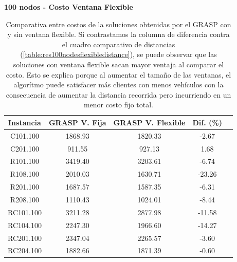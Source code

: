 \documentclass{article}
\begin{document}
  \begin{table}[h!]
    \centering
    \caption*{{\bf 100 nodos - Costo Ventana Flexible}}
    \begin{tabular}{ccccc}
      \toprule
      Instancia & GRASP V. Fija & GRASP V. Flexible & Dif. (\%) \\
      \midrule
      C101.100  & 1868.93 & 1820.33 &  -2.67 \\
      C201.100  &  911.55 &  927.13 &   1.68 \\
      R101.100  & 3419.40 & 3203.61 &  -6.74 \\
      R108.100  & 2010.03 & 1630.71 & -23.26 \\
      R201.100  & 1687.57 & 1587.35 &  -6.31 \\
      R208.100  & 1110.43 & 1024.01 &  -8.44 \\ 
      RC101.100 & 3211.28 & 2877.98 & -11.58 \\
      RC104.100 & 2247.30 & 1966.60 & -14.27 \\
      RC201.100 & 2347.04 & 2265.57 &  -3.60 \\
      RC204.100 & 1882.66 & 1871.39 &  -0.60 \\
      \bottomrule
    \end{tabular}
    \caption{Comparativa entre costos de la soluciones obtenidas por el GRASP con y sin ventana flexible. Si contrastamos la columna de diferencia contra el cuadro comparativo de distancias (\ref{table:res100nodesflexibledistance}), se puede observar que las soluciones con ventana flexible sacan mayor ventaja al comparar el costo. Esto se explica porque al aumentar el tamaño de las ventanas, el algorítmo puede satisfacer más clientes con menos vehículos con la consecuencia de aumentar la distancia recorrida pero incurriendo en un menor costo fijo total.}\label{table:res100nodesflexiblecost}
  \end{table}
\end{document}
